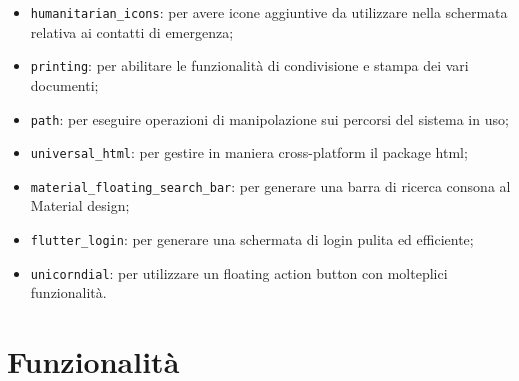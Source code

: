 \documentclass[12pt,a4paper,twoside,openright,titlepage]{book}
\begin{document}
\begin{itemize}
\item \texttt{humanitarian\_icons}: per avere icone aggiuntive da utilizzare nella schermata relativa ai contatti di emergenza;
\item \texttt{printing}: per abilitare le funzionalità di condivisione e stampa dei vari documenti;
\item \texttt{path}: per eseguire operazioni di manipolazione sui percorsi del sistema in uso;
\item \texttt{universal\_html}: per gestire in maniera cross-platform il package html;
\item \texttt{material\_floating\_search\_bar}: per generare una barra di ricerca consona al Material design;
\item \texttt{flutter\_login}: per generare una schermata di login pulita ed efficiente;
\item \texttt{unicorndial}: per utilizzare un floating action button con molteplici funzionalità.
\end{itemize}


\chapter{Funzionalità}
\end{document}
